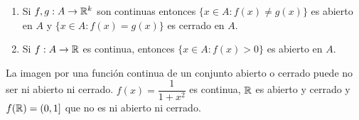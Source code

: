 \begin{corollary}
  \begin{enumerate}
    \item Si $f,g : A \to \mathbb{R}^k$ son continuas entonces $\{ x \in A : f(x) \neq g(x) \}$ es abierto en $A$ y $\{x \in A: f(x) = g(x)\}$ es cerrado en $A$.
    \item Si $f: A \to \mathbb{R}$ es continua, entonces $\{x \in A : f(x) > 0\}$ es abierto en $A$.
  \end{enumerate}
\end{corollary}

\begin{note}
  La imagen por una función continua de un conjunto abierto o cerrado puede no ser ni abierto ni cerrado. $f(x) = \dfrac{1}{1+x^2}$ es continua, $\mathbb{R}$ es abierto y cerrado y $f(\mathbb{R}) = (0, 1]$ que no es ni abierto ni cerrado.
\end{note}
